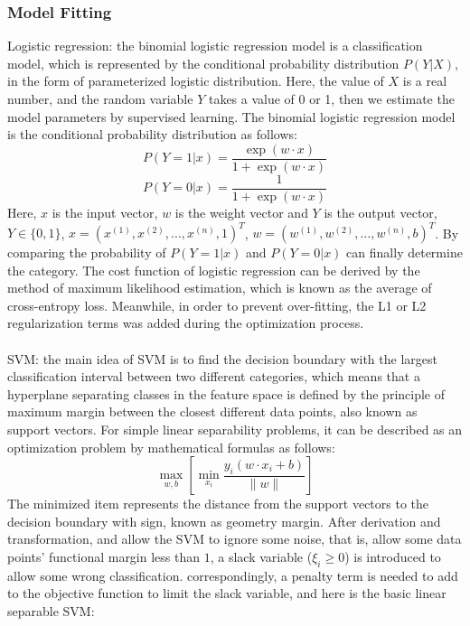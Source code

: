 \documentclass[12pt,a4paper]{article}
\begin{document}
\subsubsection{Model Fitting}
Logistic regression: the binomial logistic regression model is a classification model, which is represented by the conditional probability distribution $ P(Y|X) $, in the form of parameterized logistic distribution. Here, the value of $X$ is a real number, and the random variable $Y$ takes a value of 0 or 1, then we estimate the model parameters by supervised learning. The binomial logistic regression model is the conditional probability distribution as follows: 
\begin{displaymath}
    P(Y=1|x) = \frac{\exp(w\cdot x)}{1+\exp(w\cdot x)}
\end{displaymath}
\begin{displaymath}
    P(Y=0|x) = \frac{1}{1+\exp(w\cdot x)}
\end{displaymath}
Here, $x$ is the input vector, $w$ is the weight vector and $Y$ is the output vector, $Y\in{\{0,1\}}$, $ x = (x^{(1)},x^{(2)},...,x^{(n)},1)^{T} $, $ w = (w^{(1)},w^{(2)},...,w^{(n)},b)^{T} $. By comparing the probability of $P(Y=1|x)$ and $P(Y=0|x)$ can finally determine the category. The cost function of logistic regression can be derived by the method of maximum likelihood estimation, which is known as the average of cross-entropy loss. Meanwhile, in order to prevent over-fitting, the L1 or L2 regularization terms was added during the optimization process.
\\
\\
SVM: the main idea of SVM is to find the decision boundary with the largest classification interval between two different categories, which means that a hyperplane separating classes in the feature space is defined by the principle of maximum margin between the closest different data points, also known as support vectors. For simple linear separability problems, it can be described as an optimization problem by mathematical formulas as follows:  
\begin{displaymath}
    \max _ { w,b } \left[ \min _ { x _ { i } } \frac { y _ { i } \left( w\cdot x _ { i } + b \right) } { \| w \| } \right]
\end{displaymath}
The minimized item represents the distance from the support vectors to the decision boundary with sign, known as geometry margin. After derivation and transformation, and allow the SVM to ignore some noise, that is, allow some data points' functional margin less than $1$, a slack variable ($\xi _ { i } \geq 0$) is introduced to allow some wrong classification. correspondingly, a penalty term is needed to add to the objective function to limit the slack variable, and here is the basic linear separable SVM:
\end{document}
